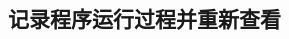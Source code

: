 \documentclass[class=book, crop=false]{standalone}
\begin{document}
\begin{CJK}{UTF8}{gbsn}

\chapter{记录程序运行过程并重新查看}



\cleardoublepage

\end{CJK}
\end{document}
